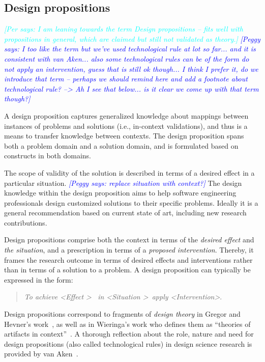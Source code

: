 \documentclass[graybox]{svmult}
\newcommand{\peggy}[1]{\textcolor{blue}{{\it [Peggy says: #1]}}}
\newcommand{\per}[1]{\textcolor{cyan}{{\it [Per says: #1]}}}
\newcommand{\peggy}[1]{}
\newcommand{\per}[1]{}
\begin{document}
\subsection{Design propositions}
\label{sec:technologicalrules}

\per{I am leaning towards the term Design propositions -- fits well with propositions in general, which are claimed but still not validated as theory.}
\peggy{I too like the term but we've used technological rule at lot so far... and it is consistent with van Aken...   also some technological rules can be of the form do not apply an intervention, guess that is still ok though... I think I prefer it, do we introduce that term -- perhaps we should remind here and add a footnote about technological rule? --> Ah I see that below... is it clear we come up with that term though?}

A design proposition captures generalized knowledge about mappings between instances of problems and solutions (i.e., in-context validations), and thus is a means to transfer knowledge between contexts. The design proposition spans both a problem domain and a solution domain, and is formulated based on constructs in both domains. 

The scope of validity of the solution is described in terms of a desired effect in a particular situation. 
\peggy{replace situation with context?}
The design knowledge within the design proposition aims to help software engineering professionals design customized solutions to their specific problems. Ideally it is a general recommendation based on current state of art, including new research contributions.

Design propositions comprise both the context in terms of the \emph{desired effect} and \emph{the situation}, and a prescription in terms of a \emph{proposed intervention}. Thereby, it frames the research outcome in terms of desired effects and interventions rather than in terms of a solution to a problem. A design proposition can typically be expressed in the form: 

\begin{quote}{\emph{To achieve \textless Effect \textgreater ~ in \textless Situation \textgreater~apply \textless Intervention\textgreater}.} 
\end{quote}
Design propositions correspond to fragments of \emph{design theory} in Gregor and Hevner's work~\cite{gregor_positioning_2013}, as well as in Wieringa's work who defines them as ``theories of artifacts in context''~\cite{wieringa_design_2009}. A thorough reflection about the role, nature and need for design propositions (also called technological rules) in design science research is provided by van Aken~\cite{van_aken_management_2004}.
\end{document}
